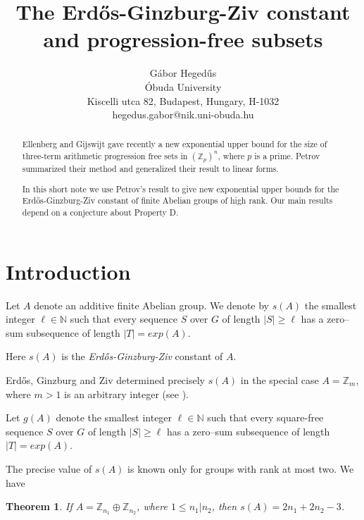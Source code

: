 \documentclass[12pt]{article}
\title{The Erd\H{o}s-Ginzburg-Ziv  constant and progression-free subsets}
\author{G\'abor Heged\H{u}s
\\{\normalsize  \'Obuda University}
\\{\normalsize Kiscelli utca 82, Budapest, Hungary, H-1032}
\\{\normalsize hegedus.gabor@nik.uni-obuda.hu}
}
\newtheorem{thm}{Theorem}[section]
\newcommand{\Zm}{\mathbb Z _m}
\newcommand{\N}{\mathbb N}
\newcommand{\Z}{\mathbb Z}
\begin{document}
\maketitle

\begin{abstract}
Ellenberg and Gijswijt gave recently a new exponential upper bound for the size of three-term arithmetic progression free sets in $({\mathbb Z _p})^n$, where $p$ is a prime. Petrov summarized their method and generalized their result to linear forms.

In this short note we use Petrov's result to give new exponential upper bounds for the   Erd\H{o}s-Ginzburg-Ziv  constant of finite Abelian groups of high rank. Our main results depend on a conjecture about Property D. 
\end{abstract}
\medskip
{}

\noindent

\section{Introduction}




Let $A$ denote an additive finite Abelian group. 
We denote by $s(A)$ the smallest integer $\ell\in \N$ such that every sequence $S$ over $G$ of length $|S|\geq \ell$ has a zero--sum subsequence of length $|T|=exp(A)$.

Here $s(A)$ is the {\em Erd\H{o}s-Ginzburg-Ziv} constant of $A$.

Erd\H{o}s, Ginzburg and Ziv determined precisely $s(A)$ in the special case $A=\Zm$, where $m>1$ is an arbitrary integer (see \cite{EGZ}). 

Let $g(A)$ denote the smallest integer $\ell\in \N$ such that every square-free sequence $S$ over $G$ of length $|S|\geq \ell$ has a zero--sum subsequence of length $|T|=exp(A)$.


The precise value of $s(A)$  is known only for groups with rank at most two. We have
\begin{thm}
If $A=\Z_{n_1} \oplus \Z_{n_2}$, where $1\leq n_1 | n_2$, then
$s(A)=2n_1+2n_2-3$. 
\end{thm}
\end{document}
